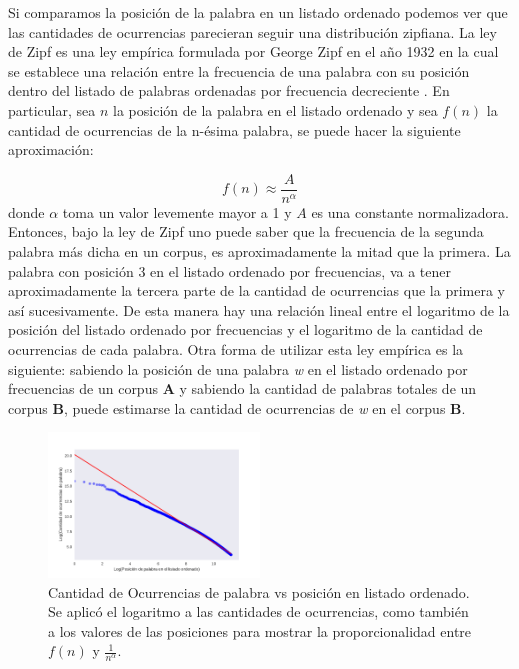Si comparamos la posición de la palabra en un listado ordenado podemos ver que  las cantidades de ocurrencias parecieran seguir una distribución zipfiana. La ley de Zipf es una ley empírica formulada por George Zipf en el año 1932 en la cual se establece una relación entre la frecuencia de una palabra con su posición dentro del listado de palabras ordenadas por frecuencia decreciente \cite{montemurro2001beyond,zipf2016human}. En particular, sea $n$ la posición de la palabra en el listado ordenado y sea $f(n)$ la cantidad de ocurrencias de la n-ésima palabra, se puede hacer la siguiente aproximación:

$$f(n) \approx \frac{A}{n^{\alpha}}$$
donde $\alpha$ toma un valor levemente mayor a 1 y $A$ es una constante normalizadora.
Entonces, bajo la ley de Zipf uno puede saber que la frecuencia de la segunda palabra más dicha en un corpus, es aproximadamente la mitad que la primera. La palabra con posición 3 en el listado ordenado por frecuencias, va a tener aproximadamente la tercera parte de la cantidad de ocurrencias que la primera y así sucesivamente. De esta manera hay una relación lineal entre el logaritmo de la posición del listado ordenado por frecuencias y el logaritmo de la cantidad de ocurrencias de cada palabra.
Otra forma de utilizar esta ley empírica es la siguiente:
sabiendo la posición de una palabra \textit{w} en el listado ordenado por frecuencias de un corpus \textbf{A} y sabiendo la cantidad de palabras totales de un corpus \textbf{B}, puede estimarse la cantidad de ocurrencias de \textit{w} en el corpus \textbf{B}.

\begin{figure}[!ht]
\centering
\includegraphics[width=0.5\textwidth]{./images/zipf.pdf}
\caption{Cantidad de Ocurrencias de palabra vs posición en listado ordenado. Se aplicó el logaritmo a las cantidades de ocurrencias, como también a los valores de las posiciones para mostrar la proporcionalidad entre $f(n)$ y $\frac{1}{n^{\alpha}}$.} 
\label{fig:zipf} 
\end{figure}



